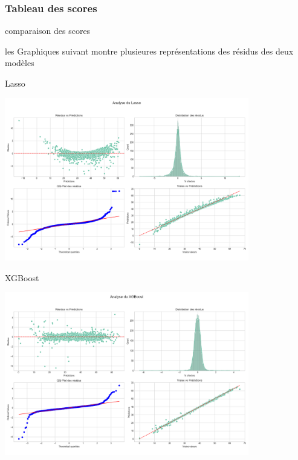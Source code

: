     \subsubsection{Tableau des scores}
    \begin{frame}{comparaison des scores}
           
    \end{frame}
    
    \begin{frame}
        les Graphiques suivant montre plusieures représentations des résidus des deux modèles 
    \end{frame}
    \begin{frame}{Lasso}
        \begin{center}
            \includegraphics[width=0.8\textwidth]{figures/graphs_analyse_model_Lasso.png}
        \end{center}
    
    \end{frame} 

              
        
    \begin{frame}{XGBoost}
        \begin{center}
            \includegraphics[width=0.8\textwidth]{figures/graphs_analyse_model_XGBoost.png}
        \end{center}
    
    \end{frame}    
        


